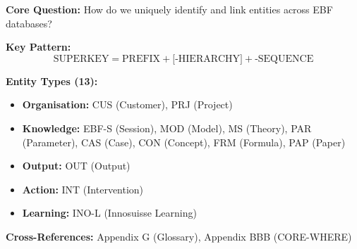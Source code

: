 \begin{tcolorbox}[colback=blue!5!white, colframe=blue!75!black,
    title=Quick Reference: Superkey Specification]

\textbf{Core Question:} How do we uniquely identify and link entities across EBF databases?

\textbf{Key Pattern:}
\begin{equation}
\text{SUPERKEY} = \text{PREFIX} + \text{[-HIERARCHY]} + \text{-SEQUENCE}
\end{equation}

\textbf{Entity Types (13):}
\begin{itemize}[nosep]
\item \textbf{Organisation:} CUS (Customer), PRJ (Project)
\item \textbf{Knowledge:} EBF-S (Session), MOD (Model), MS (Theory), PAR (Parameter), CAS (Case), CON (Concept), FRM (Formula), PAP (Paper)
\item \textbf{Output:} OUT (Output)
\item \textbf{Action:} INT (Intervention)
\item \textbf{Learning:} INO-L (Innosuisse Learning)
\end{itemize}

\textbf{Cross-References:} Appendix G (Glossary), Appendix BBB (CORE-WHERE)
\end{tcolorbox}



